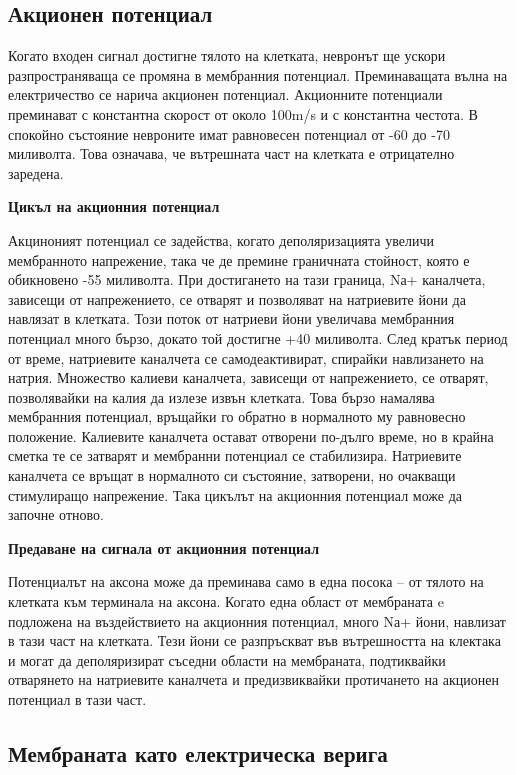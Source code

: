 \documentclass{article}
\begin{document}
\subsection{Акционен потенциал}
Когато входен сигнал достигне тялото на клетката, невронът ще ускори разпространяваща се промяна в мембранния потенциал. Преминаващата вълна на електричество се нарича акционен потенциал. Акционните потенциали преминават с константна скорост от около 100m/s и с константна честота. 
В спокойно състояние невроните имат равновесен потенциал от -60 до -70 миливолта. Това означава, че вътрешната част на клетката е отрицателно заредена.

\textbf{Цикъл на акционния потенциал}

Акциноният потенциал се задейства, когато деполяризацията увеличи мембранното напрежение, така че де премине граничната стойност, която е обикновено -55 миливолта. При достигането на тази граница, Nа+ каналчета, зависещи от напрежението, се отварят и позволяват на натриевите йони да навлязат в клетката. Този поток от натриеви йони увеличава мембранния потенциал много бързо, докато той достигне +40 миливолта. След кратък период от време, натриевите каналчета се самодеактивират, спирайки навлизането на натрия. Множество калиеви каналчета, зависещи от напрежението, се отварят, позволявайки на калия да излезе извън клетката. Това бързо намалява мембранния потенциал, връщайки го обратно в нормалното му равновесно положение. Калиевите каналчета остават отворени по-дълго време, но в крайна сметка те се затварят и мембранни потенциал се стабилизира. Натриевите каналчета се връщат в нормалното си състояние, затворени, но очакващи стимулиращо напрежение. Така цикълът на акционния потенциал може да започне отново.

\vspace{5mm} %
\textbf{Предаване на сигнала от акционния потенциал}

Потенциалът на аксона може да преминава само в една посока -- от тялото на клетката към терминала на аксона. Когато една област от мембраната e подложена на въздействието на акционния потенциал, много Nа+ йони, навлизат в тази част на клетката. Тези йони се разпръскват във вътрешността на клектака и могат да деполяризират съседни области на мембраната, подтиквайки отварянето на натриевите каналчета и предизвиквайки протичането на акционен потенциал в тази част.

\vspace{5mm} %
\subsection{Мембраната като електрическа верига}
\end{document}
